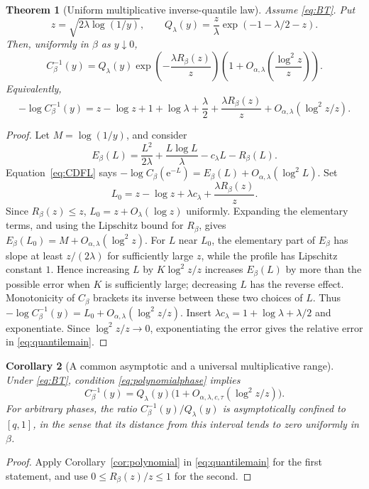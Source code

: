 \documentclass[11pt,a4paper]{article}
\newtheorem{theorem}{Theorem}[section]
\newtheorem{corollary}[theorem]{Corollary}
\theoremstyle{definition}
\theoremstyle{remark}\newtheorem{remark}[theorem]{Remark}
\newcommand{\e}{\mathrm e}
\newcommand{\at}{\alpha,\lambda}
\begin{document}
\begin{theorem}[Uniform multiplicative inverse-quantile law]
\label{thm:quantile}
Assume \eqref{eq:BT}.  Put
\begin{equation}
 z=\sqrt{2\lambda\log(1/y)},\qquad
 Q_\lambda(y)=\frac z\lambda\exp(-1-\lambda/2-z).
 \label{eq:Qdef}
\end{equation}
Then, uniformly in $\beta$ as $y\downarrow0$,
\begin{equation}
 C_\beta^{-1}(y)=Q_\lambda(y)
     \exp\!\left(-\frac{\lambda R_\beta(z)}{z}\right)
     \left(1+O_{\at}\!\left(\frac{\log^2 z}{z}\right)\right).
 \label{eq:quantilemain}
\end{equation}
Equivalently,
\begin{equation}
 -\log C_\beta^{-1}(y)
 =z-\log z+1+\log\lambda+\frac\lambda2
       +\frac{\lambda R_\beta(z)}{z}
       +O_{\at}(\log^2 z/z).
 \label{eq:logquantile}
\end{equation}
\end{theorem}
\begin{proof}
Let $M=\log(1/y)$, and consider
\[
 E_\beta(L)=\frac{L^2}{2\lambda}+\frac{L\log L}{\lambda}
             -c_\lambda L-R_\beta(L).
\]
Equation~\eqref{eq:CDFL} says
$-\log C_\beta(\e^{-L})=E_\beta(L)+O_{\at}(\log^2 L)$.
Set
\[
 L_0=z-\log z+\lambda c_\lambda+\frac{\lambda R_\beta(z)}{z}.
\]
Since $R_\beta(z)\le z$, $L_0=z+O_\lambda(\log z)$ uniformly.
Expanding the elementary terms, and using the Lipschitz bound for $R_\beta$,
gives
$E_\beta(L_0)=M+O_{\at}(\log^2 z)$.
For $L$ near $L_0$, the elementary part of $E_\beta$ has slope at least
$z/(2\lambda)$ for sufficiently large $z$, while the profile has Lipschitz
constant $1$.  Hence increasing $L$ by $K\log^2 z/z$ increases $E_\beta(L)$
by more than the possible error when $K$ is sufficiently large; decreasing
$L$ has the reverse effect.  Monotonicity of $C_\beta$ brackets its inverse
between these two choices of $L$.
Thus $-\log C_\beta^{-1}(y)=L_0+O_{\at}(\log^2 z/z)$.
Insert $\lambda c_\lambda=1+\log\lambda+\lambda/2$ and exponentiate.
Since $\log^2 z/z\to0$, exponentiating the error gives the relative error in
\eqref{eq:quantilemain}.
\end{proof}

\begin{corollary}[A common asymptotic and a universal multiplicative range]
\label{cor:Qcommon}
Under \eqref{eq:BT}, condition \eqref{eq:polynomialphase} implies
\[
 C_\beta^{-1}(y)=Q_\lambda(y)
       \bigl(1+O_{\alpha,\lambda,c,\tau}(\log^2 z/z)\bigr).
\]
For arbitrary phases, the ratio $C_\beta^{-1}(y)/Q_\lambda(y)$ is
asymptotically confined to $[q,1]$, in the sense that its distance from this
interval tends to zero uniformly in $\beta$.
\end{corollary}
\begin{proof}
Apply Corollary~\ref{cor:polynomial} in \eqref{eq:quantilemain} for the first
statement, and use $0\le R_\beta(z)/z\le1$ for the second.
\end{proof}
\end{document}
